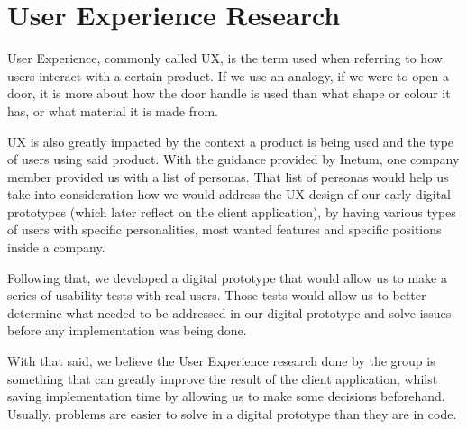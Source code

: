 \documentclass[a4paper,twoside,10pt]{report}
\begin{document}
\chapter{User Experience Research}
User Experience, commonly called UX, is the term used when referring to how users interact with a certain product. If we use an analogy, if we were to open a door, it is more about how the door handle is used than what shape or colour it has, or what material it is made from. 

UX is also greatly impacted by the context a product is being used and the type of users using said product. With the guidance provided by Inetum, one company member provided us with a list of personas. That list of personas would help us take into consideration how we would address the UX design of our early digital prototypes (which later reflect on the client application), by having various types of users with specific personalities, most wanted features and specific positions inside a company. 

Following that, we developed a digital prototype that would allow us to make a series of usability tests with real users. Those tests would allow us to better determine what needed to be addressed in our digital prototype and solve issues before any implementation was being done.

With that said, we believe the User Experience research done by the group is something that can greatly improve the result of the client application, whilst saving implementation time by allowing us to make some decisions beforehand. Usually, problems are easier to solve in a digital prototype than they are in code.
\end{document}
